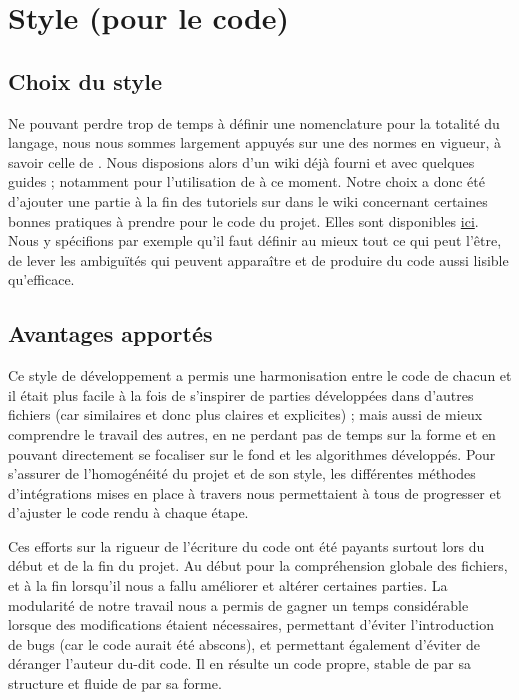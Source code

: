 \documentclass[a4paper, 12pt]{report}
\newcommand{\tech}[1]{\sf{#1}}
\begin{document}
    \section{Style (pour le code)}
    
    \subsection{Choix du style}
    
    Ne pouvant perdre trop de temps à définir une nomenclature pour la totalité du langage, nous nous sommes largement appuyés sur une des normes en vigueur, à savoir celle de \href{https://docs.scala-lang.org/style/}{\tech{Scala}}.
    Nous disposions alors d'un wiki déjà fourni et avec quelques guides ; notamment pour l'utilisation de \tech{git} à ce moment. Notre choix a donc été d'ajouter une partie à la fin des tutoriels sur \tech{git} dans le wiki concernant certaines bonnes pratiques à prendre pour le code du projet. Elles sont disponibles \href{https://gitlab.telecomnancy.univ-lorraine.fr/Projets\_TOP/projet\_top\_a2/wikis/Helper\#bonnes-pratiques-de-d\%C3\%A9veloppement}{ici}.
    Nous y spécifions par exemple qu'il faut définir au mieux tout ce qui peut l'être, de lever les ambiguïtés qui peuvent apparaître et de produire du code aussi lisible qu'efficace.
    
    \subsection{Avantages apportés}
    
    Ce style de développement a permis une harmonisation entre le code de chacun et il était plus facile à la fois de s'inspirer de parties développées dans d'autres fichiers (car similaires et donc plus claires et explicites) ; mais aussi de mieux comprendre le travail des autres, en ne perdant pas de temps sur la forme et en pouvant directement se focaliser sur le fond et les algorithmes développés. Pour s'assurer de l'homogénéité du projet et de son style, les différentes méthodes d'intégrations mises en place à travers \tech{GitLab} nous permettaient à tous de progresser et d'ajuster le code rendu à chaque étape.
    
    Ces efforts sur la rigueur de l'écriture du code ont été payants surtout lors du début et de la fin du projet. Au début pour la compréhension globale des fichiers, et à la fin lorsqu'il nous a fallu améliorer et altérer certaines parties. La modularité de notre travail nous a permis de gagner un temps considérable lorsque des modifications étaient nécessaires, permettant d'éviter l'introduction de bugs (car le code aurait été abscons), et permettant également d'éviter de déranger l'auteur du-dit code. Il en résulte un code propre, stable de par sa structure et fluide de par sa forme.
    
\end{document}
